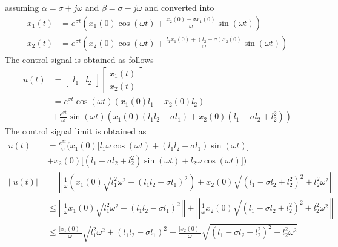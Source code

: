 assuming $\alpha=\sigma+j\omega$ and $\beta=\sigma-j\omega$ and converted into 
\begin{equation}
\begin{split}
x_1(t)&=e^{\sigma t}\left(x_1(0)\cos{(\omega t)}+\frac{x_2(0)-\sigma x_1(0)}{\omega}\sin{(\omega t)}\right)\\
x_2(t)&=e^{\sigma t}\left(x_2(0)\cos{(\omega t)}+\frac{l_1x_1(0)+(l_2-\sigma) x_2(0)}{\omega}\sin{(\omega t)}\right)
\end{split}
\end{equation}
The control signal is obtained as follows
\begin{equation}
    \begin{split}
    u(t)&=\begin{bmatrix}l_1&l_2\end{bmatrix}\begin{bmatrix}x_1(t)\\x_2(t)\end{bmatrix}\\
    &=e^{\sigma t}\cos{(\omega t)}\left(
        x_1(0)l_1+x_2(0)l_2
    \right)\\
    &+\frac{e^{\sigma t}}{\omega}\sin{(\omega t)}\left(
        x_1(0)(l_1l_2-\sigma l_1)+x_2(0)(l_1-\sigma l_2+l_2^2)
    \right)
    \end{split}
\end{equation}
The control signal limit is obtained as
\begin{equation}
    \begin{split}
    u(t)&=\frac{e^{\sigma t}}{\omega}\Big(
        x_1(0)\Big[
            l_1\omega\cos{(\omega t)}+(l_1l_2-\sigma l_1)\sin{(\omega t)}\Big]\\
        &+x_2(0)\Big[
        (l_1-\sigma l_2+l_2^2)\sin{(\omega t)}+l_2\omega\cos{(\omega t)}
        \Big]
    \Big)\\
    ||u(t)||&=\left|\left|\frac{1}{\omega}(x_1(0)\sqrt{l_1^2\omega^2+(l_1l_2-\sigma l_1)^2})
    +x_2(0)\sqrt{(l_1-\sigma l_2+l_2^2)^2+l_2^2\omega^2}\right|\right|\\
    &\leq \left|\left|\frac{1}{\omega}x_1(0)\sqrt{l_1^2\omega^2+(l_1l_2-\sigma l_1)^2}\right|\right|+\left|\left|\frac{1}{\omega}x_2(0)\sqrt{(l_1-\sigma l_2+l_2^2)^2+l_2^2\omega^2}\right|\right|\\
    &\leq \frac{|x_1(0)|}{\omega}\sqrt{l_1^2\omega^2+(l_1l_2-\sigma l_1)^2}+\frac{|x_2(0)|}{\omega}\sqrt{(l_1-\sigma l_2+l_2^2)^2+l_2^2\omega^2}\\
    \end{split}
\end{equation}

